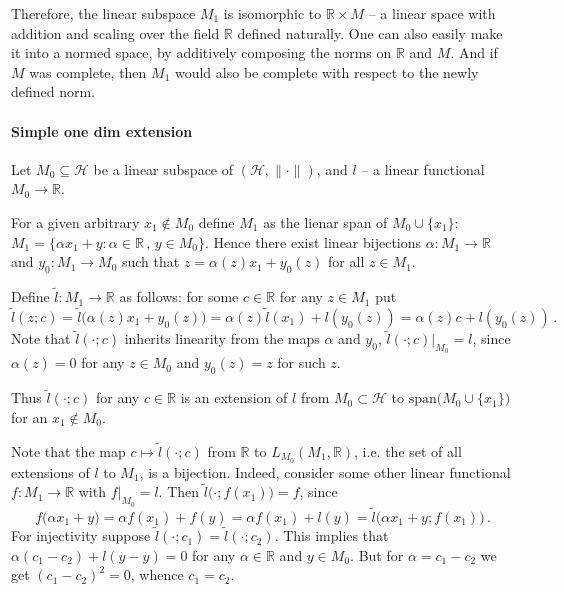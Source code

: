 \documentclass[a4paper]{article}
\newcommand{\Hcal}{\mathcal{H}}
\newcommand{\real}{\mathbb{R}}
\begin{document}
Therefore, the linear subspace $M_1$ is isomorphic to $\real \times M$ -- a linear
space with addition and scaling over the field $\real$ defined naturally. One can
also easily make it into a normed space, by additively composing the norms on $\real$
and $M$. And if $M$ was complete, then $M_1$ would also be complete with respect to
the newly defined norm.


\paragraph{Simple one dim extension} %
\label{par:simple_one_dim_extension}

Let $M_0 \subseteq \Hcal$ be a linear subspace of $(\Hcal, \|\cdot\|)$, and $l$
-- a linear functional $M_0\to \real$.

For a given arbitrary $x_1\notin M_0$ define $M_1$ as the lienar span of $M_0 \cup
\{x_1\}$: $M_1 = \{\alpha x_1 + y \colon \alpha \in \real\,,\, y \in M_0\}$. Hence
there exist linear bijections $\alpha\colon M_1\to \real$ and $y_0\colon M_1\to M_0$
such that $z = \alpha(z) x_1 + y_0(z)$ for all $z\in M_1$.

Define $\tilde{l}\colon M_1 \to \real$ as follows: for some $c \in \real$ for any 
$z \in M_1$ put
\begin{equation*}
  \tilde{l}(z; c)
    = \tilde{l}\bigl(\alpha(z) x_1 + y_0(z) \bigr)
    = \alpha(z) \tilde{l}(x_1) + l(y_0(z))
    = \alpha(z) c + l(y_0(z))
    \,.
\end{equation*}
Note that $\tilde{l}(\cdot; c)$ inherits linearity from the maps $\alpha$ and $y_0$,
$\tilde{l}(\cdot; c)\big\vert_{M_0} = l$, since $\alpha(z) = 0$ for any $z\in M_0$
and $y_0(z) = z$ for such $z$.

Thus $\tilde{l}(\cdot; c)$ for any $c\in \real$ is an extension of $l$ from $M_0
\subset \Hcal$ to $\mathrm{span} \bigl(M_0 \cup \{x_1\}\bigr)$ for an $x_1\notin
M_0$.

Note that the map $c\mapsto \tilde{l}(\cdot; c)$ from $\real$ to $L_{M_0}(M_1, \real)$,
i.e. the set of all extensions of $l$ to $M_1$, is a bijection. Indeed, consider some
other linear functional $f\colon M_1 \to \real$ with $f\big\vert_{M_0} = l$. Then
$\tilde{l}\bigl(\cdot; f(x_1)\bigr) = f$, since
\begin{equation*}
  f\bigl(\alpha x_1 + y \bigr)
    = \alpha f(x_1) + f(y)
    = \alpha f(x_1) + l(y)
    = \tilde{l}\bigl(\alpha x_1 + y; f(x_1)\bigr)
    \,.
\end{equation*}
For injectivity suppose $\tilde{l}(\cdot; c_1) = \tilde{l}(\cdot; c_2)$. This implies
that $\alpha (c_1 - c_2) + l(y - y) = 0$ for any $\alpha \in \real$ and $y\in M_0$.
But for $\alpha = c_1 - c_2$ we get $(c_1 - c_2)^2 = 0$, whence $c_1 = c_2$.
\end{document}
